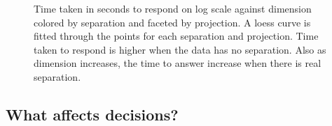 \begin{figure}[hbtp]
   \centering
      \caption{Time taken in seconds to respond on log scale against dimension colored by separation and faceted by projection. A loess curve is fitted through the points for each separation and projection. Time taken to respond is higher when the data has no separation. Also as dimension increases, the time to answer increase when there is real separation. }
       \label{time-taken}
\end{figure}

\subsection{What affects decisions?}

\normalsize

